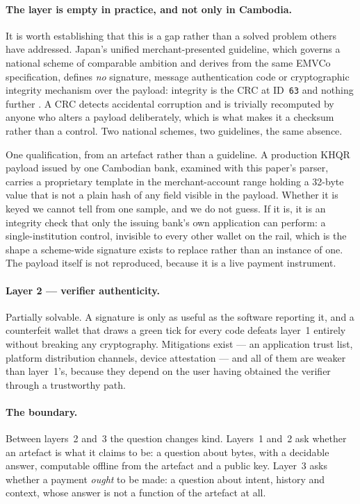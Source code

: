 \documentclass[10pt,a4paper,twocolumn]{article}
\newcommand{\code}[1]{\texttt{\small #1}}
\begin{document}
\paragraph{The layer is empty in practice, and not only in Cambodia.} It is
worth establishing that this is a gap rather than a solved problem others have
addressed. Japan's unified merchant-presented guideline, which governs a
national scheme of comparable ambition and derives from the same EMVCo
specification, defines \emph{no} signature, message authentication code or
cryptographic integrity mechanism over the payload: integrity is the CRC at
ID~\code{63} and nothing further \citep{jpqrmpm}. A CRC detects accidental
corruption and is trivially recomputed by anyone who alters a payload
deliberately, which is what makes it a checksum rather than a control. Two
national schemes, two guidelines, the same absence.

One qualification, from an artefact rather than a guideline. A production
KHQR payload issued by one Cambodian bank, examined with this paper's parser,
carries a proprietary template in the merchant-account range holding a
32-byte value that is not a plain hash of any field visible in the payload.
Whether it is keyed we cannot tell from one sample, and we do not guess. If
it is, it is an integrity check that only the issuing bank's own application
can perform: a single-institution control, invisible to every other wallet on
the rail, which is the shape a scheme-wide signature exists to replace rather
than an instance of one. The payload itself is not reproduced, because it is
a live payment instrument.

\paragraph{Layer 2 --- verifier authenticity.}
Partially solvable. A signature is only as useful as the software reporting it,
and a counterfeit wallet that draws a green tick for every code defeats layer~1
entirely without breaking any cryptography. Mitigations exist --- an application
trust list, platform distribution channels, device attestation --- and all of them
are weaker than layer~1's, because they depend on the user having obtained the
verifier through a trustworthy path.

\paragraph{The boundary.}
Between layers~2 and~3 the question changes kind. Layers~1 and~2 ask whether an
artefact is what it claims to be: a question about bytes, with a decidable
answer, computable offline from the artefact and a public key. Layer~3 asks
whether a payment \emph{ought} to be made: a question about intent, history and
context, whose answer is not a function of the artefact at all.
\end{document}
